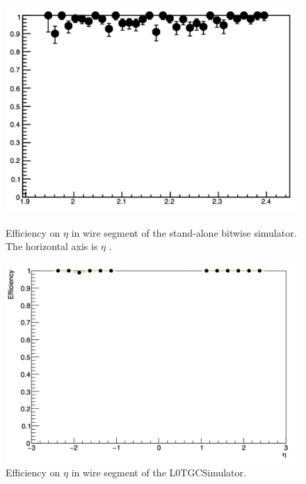 \begin{figure}[htbp]
  \begin{minipage}{0.485\textwidth}
    \centering
    \vspace{2mm}
    \includegraphics[width=\linewidth]{figs/chapter5/yamashita_wire_eff.png}
    \caption{Efficiency on $\eta$ in wire segment of the stand-alone bitwise simulator. The horizontal axis is $\eta$ \cite{yamashita}.}
    \label{fig:yama_wire}
  \end{minipage}
  \hfill
  \begin{minipage}{0.505\textwidth}
    \centering
    \includegraphics[width=\linewidth]{figs/chapter5/eff_wire_eta.png}
    \caption{Efficiency on $\eta$ in wire segment of the L0TGCSimulator.}
    \label{fig:eff_wire_eta}
  \end{minipage}
\end{figure}

